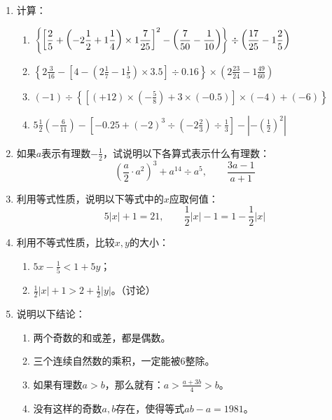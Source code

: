 \begin{enumerate}
\item 计算：
\begin{enumerate}
    \item $\left\{\left[\dfrac{2}{5}+\left(-2\dfrac{1}{2}+1\dfrac{1}{4}\right)\times 1\dfrac{7}{25}\right]^2-\left(\dfrac{7}{50}-\dfrac{1}{10}\right)     \right\}\div\left(\dfrac{17}{25}-1 \dfrac{2}{5}\right) $
    \item $\left\{2 \frac{3}{16}-\left[4-\left(2 \frac{1}{7}-1 \frac{1}{5}\right) \times 3.5\right] \div 0.16\right\} 
\times\left(2 \frac{23}{24}-1 \frac{49}{60}\right) $
\item $(-1)\div \left\{\left[(+12) \times\left(-\frac{5}{8}\right)+3 \times(-0.5) \right] \times(-4)+(-6)\right\} $
\item $5 \frac{1}{2}\left(-\frac{6}{11}\right)-\left[-0.25+(-2)^{3}\div \left(-2 \frac{2}{3}\right) \div \frac{1}{3}\right]-\left|-\left(\frac{1}{2}\right)^{2}\right|$
\end{enumerate}

\item   如果$a$表示有理数$-\frac{1}{2}$，试说明以下各算式表示什么有理数：
\[\left(\frac{a}{2}\cdot a^2\right)^3+a^{14}\div a^5,\qquad \frac{3a-1}{a+1}  \]

\item   利用等式性质，说明以下等式中的$x$应取何值：
\[5|x|+1=21,\qquad \frac{1}{2}|x|-1=1-\frac{1}{2}|x|  \]

\item  利用不等式性质，比较$x,  y$的大小：
\begin{enumerate}
    \item $5x-\frac{1}{5}<1+5y$；
    \item $\frac{1}{2}|x|+1>2+\frac{1}{2}|y|$。（讨论）
\end{enumerate}

\item 说明以下结论：
\begin{enumerate}
    \item 两个奇数的和或差，都是偶数。
    \item 三个连续自然数的乘积，一定能被6整除。
    \item 如果有理数$a>b$，那么就有：$a>\frac{a+3b}{4}>b$。
    \item 没有这样的奇数$a,  b$存在，使得等式$ab-a=1981$。
\end{enumerate}


\end{enumerate}

